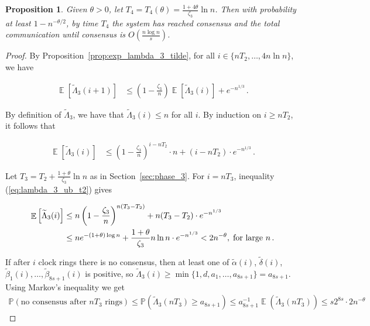\documentclass[a4paper,12pt]{article}
\newtheorem{proposition}{Proposition}
\DeclareMathOperator{\Ex}{\mathbb{E}}%
\begin{document}
\begin{proposition}
Given $\theta > 0$, let $T_4 = T_4(\theta) = \frac{1 + 4\theta}{\zeta_{3}} \ln{n}$. Then with probability at least $1 - n^{-\theta/2}$, by time $T_4$ the system has reached consensus and the total communication until consensus is $O(\frac{n \log{n}}{s})$.
\end{proposition}
\begin{proof}
By Proposition~\ref{prop:exp_lambda_3_tilde}, for all $i \in \{nT_2, \ldots, 4n \ln{n}\}$, we have
\begin{small}
\begin{align}
\Ex\left[ \widetilde{\Lambda}_{3}(i+1) \right] & \leq  \left(1 - \frac{\zeta_3}{n} \right)\Ex\left[ \widetilde{\Lambda}_{3}(i) \right] + e^{-n^{1/3}}\,.
\end{align}
\end{small}
By definition of $\widetilde{\Lambda}_3$, we have that $ \widetilde{\Lambda}_{3}(i) \leq n$ for all $i$.
By induction on $i \geq nT_2$, it follows that
\begin{small}
\begin{align} \label{eq:lambda_3_ub_t2}
\Ex\left[ \widetilde{\Lambda}_{3}(i) \right] & \leq  \left(1 - \frac{\zeta_3}{n}\right)^{i-nT_2} \cdot n + (i-nT_2) \cdot e^{-n^{1/3}}\,.
\end{align}
\end{small}
Let $T_3 = T_2 + \frac{1 + \theta}{\zeta_3} \ln{n}$ as in Section~\ref{sec:phase_3}.
For $i = nT_3$, inequality (\ref{eq:lambda_3_ub_t2}) gives
\begin{small}
	\begin{align}
	\Ex\left[ \widetilde{\Lambda}_{3}(i) \right] & \leq  n\left(1 - \frac{\zeta_3}{n}\right)^{n(T_3 - T_2)}  + n(T_3 - T_2) \cdot e^{-n^{1/3}} \notag \\
	& \leq n e^{-(1+\theta)\log{n}} + \frac{1 + \theta}{\zeta_3} n \ln{n} \cdot e^{-n^{1/3}} < 2n^{-\theta}, \; \mbox{for large } n\,.
	\end{align}
\end{small}
If after $i$ clock rings there is no consensus, then at least one of $\widetilde{\alpha}(i)$, $\widetilde{\delta}(i)$, $\widetilde{\beta}_1(i), \ldots, \widetilde{\beta}_{8s+1}(i)$ is positive, so $\widetilde{\Lambda}_3(i) \geq \min\{1, d, a_1, \ldots, a_{8s+1}\} = a_{8s+1}$. Using Markov's inequality we get
\begin{align} \label{eq:prob_no_consensus}
\mathbb{P}(\mbox{no consensus after } n T_3 \mbox{ rings})
\leq \mathbb{P}\left(\widetilde{\Lambda}_3(n T_3) \geq a_{8s+1} \right) \leq
a_{8s+1}^{-1} \Ex\left( \widetilde{\Lambda}_3(n T_3) \right) \leq s 2^{8s} \cdot 2 n^{-\theta}
\end{align}


\end{proof}
\end{document}
